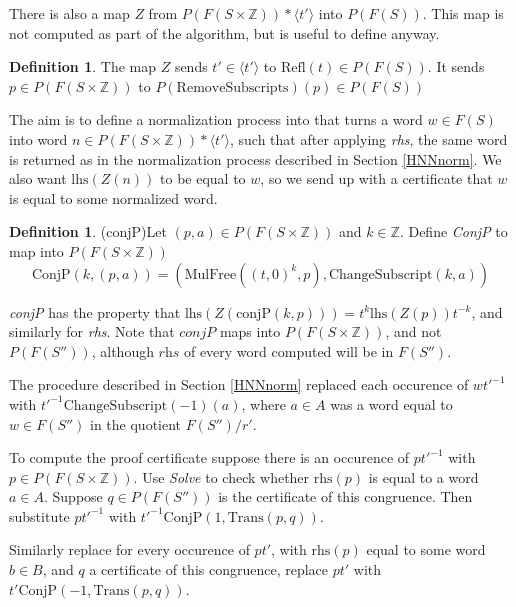 \documentclass[11pt]{article} %
\theoremstyle{definition}
\theoremstyle{definition}
\theoremstyle{definition}
\theoremstyle{definition}
\theoremstyle{definition}
\newtheorem{defn}[theorem]{Definition}
\theoremstyle{definition}
\begin{document}
There is also a map $Z$ from $P(F(S \times \mathbb{Z})) \ast \langle t' \rangle$ into
$P(F(S))$. This map is not computed as part of the algorithm, but is useful to define anyway.

\begin{defn}
  The map $Z$ sends $t' \in \langle t' \rangle$ to $\text{Refl}(t) \in P(F(S))$.
  It sends $p \in P(F(S \times \mathbb{Z}))$ to $P(\text{RemoveSubscripts})(p) \in P(F(S))$
\end{defn}

The aim is to define a normalization process into that turns a word $w \in F(S)$ into
word $n \in P(F(S \times \mathbb{Z})) \ast \langle t' \rangle$,
such that after applying \textit{rhs}, the same word is returned as in the
normalization process described in Section \ref{HNNnorm}. We also want
$\text{lhs}(Z(n))$ to be equal to $w$, so we send up with a certificate that $w$
is equal to some normalized word.

\begin{defn}(conjP)\label{conjP}
  Let $(p, a) \in P(F(S \times \mathbb{Z}))$ and $k \in \mathbb{Z}$.
  Define \textit{ConjP} to map into $P(F(S \times \mathbb{Z}))$
  \begin{equation}
    \text{ConjP}(k, (p, a)) = (\text{MulFree}((t,0)^k, p), \text{ChangeSubscript}(k, a))
  \end{equation}
\end{defn}

\textit{conjP} has the property that $\text{lhs}(Z(\text{conjP}(k, p))) = t^k \text{lhs}(Z(p))t^{-k}$,
and similarly for \textit{rhs}. Note that $\textit{conjP}$ maps into $P(F(S \times \mathbb{Z}))$,
and not $P(F(S''))$, although $\textit{rhs}$ of every word computed
will be in $F(S'')$.

The procedure described in Section \ref{HNNnorm}
replaced each occurence of $wt'^{-1}$ with \newline $t'^{-1}\text{ChangeSubscript}(-1)(a)$,
where $a \in A$ was a word equal to $w \in F(S'')$ in the quotient
$F(S'') / r'$.

To compute the proof certificate suppose there is an occurence of $pt'^{-1}$ with
$p \in P(F(S \times \mathbb{Z}))$. Use \textit{Solve} to check whether $\text{rhs}(p)$ is
equal to a word $a \in A$. Suppose $q \in  P(F(S''))$ is the certificate
of this congruence. Then substitute $pt'^{-1}$ with $t'^{-1}\text{ConjP}(1, \text{Trans}(p, q))$.

Similarly replace for every occurence of $pt'$, with $\text{rhs}(p)$ equal to some word $b \in B$,
and $q$ a certificate of this congruence, replace $pt'$ with $t'\text{ConjP}(-1, \text{Trans}(p, q))$.
\end{document}
